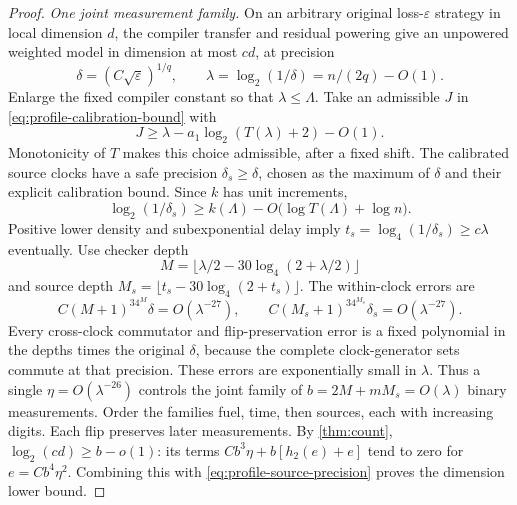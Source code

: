 \begin{proof}
\par\smallskip\noindent\textit{One joint measurement family.}\quad
On an arbitrary original loss-$\varepsilon$ strategy in local dimension $d$, the compiler transfer and residual powering give an unpowered weighted model in dimension at most $cd$, at precision
\[
 \delta=(C\sqrt\varepsilon)^{1/q},\qquad
 \lambda=\log_2(1/\delta)=n/(2q)-O(1).
\]
Enlarge the fixed compiler constant so that $\lambda\le\Lambda$. Take an admissible $J$ in \eqref{eq:profile-calibration-bound} with
\[
 J\ge\lambda-a_1\log_2(T(\lambda)+2)-O(1).
\]
Monotonicity of $T$ makes this choice admissible, after a fixed shift. The calibrated source clocks have a safe precision $\delta_s\ge\delta$, chosen as the maximum of $\delta$ and their explicit calibration bound. Since $k$ has unit increments,
\begin{equation}\label{eq:profile-source-precision}
 \log_2(1/\delta_s)\ge k(\Lambda)-O\bigl(\log T(\Lambda)+\log n\bigr).
\end{equation}
Positive lower density and subexponential delay imply $t_s=\log_4(1/\delta_s)\ge c\lambda$ eventually. Use checker depth
\[
 M=\lfloor\lambda/2-30\log_4(2+\lambda/2)\rfloor
\]
and source depth $M_s=\lfloor t_s-30\log_4(2+t_s)\rfloor$. The within-clock errors are
\[
 C(M+1)^34^M\delta=O(\lambda^{-27}),\qquad
 C(M_s+1)^34^{M_s}\delta_s=O(\lambda^{-27}).
\]
Every cross-clock commutator and flip-preservation error is a fixed polynomial in the depths times the original $\delta$, because the complete clock-generator sets commute at that precision. These errors are exponentially small in $\lambda$. Thus a single $\eta=O(\lambda^{-26})$ controls the joint family of $b=2M+mM_s=O(\lambda)$ binary measurements. Order the families fuel, time, then sources, each with increasing digits. Each flip preserves later measurements. By \cref{thm:count}, $\log_2(cd)\ge b-o(1)$: its terms $Cb^3\eta+b[h_2(e)+e]$ tend to zero for $e=Cb^4\eta^2$. Combining this with \eqref{eq:profile-source-precision} proves the dimension lower bound.


\end{proof}
